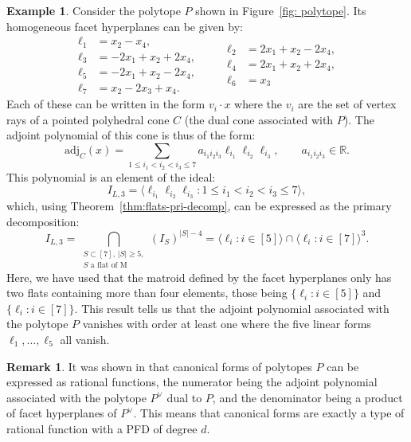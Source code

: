 \documentclass [a4paper,reqno, 11pt]{amsart}
\theoremstyle{plain}
\theoremstyle{plain}
\theoremstyle{plain}
\theoremstyle{plain}
\theoremstyle{definition}
\theoremstyle{definition}
\newtheorem{example}[theorem]{Example}
\theoremstyle{definition}
\newtheorem{remark}[theorem]{Remark}
\theoremstyle{definition}
\theoremstyle{definition}
\theoremstyle{definition}
\begin{document}
\begin{example}\label{ex: polytope adjoint polynomial}
Consider the polytope $P$ shown in Figure~\ref{fig: polytope}. Its homogeneous facet hyperplanes can be given by:
\begin{equation*}
\begin{aligned}
   \ell_1&=x_2-x_4,\\
   \ell_3&=-2x_1+x_2+2x_4,\\
   \ell_5&=-2x_1+x_2-2x_4,\\
   \ell_7&=x_2-2x_3+x_4.
\end{aligned}
\quad\quad
\begin{aligned}
    \ell_2&=2x_1+x_2-2x_4,\\
    \ell_4&=2x_1+x_2+2x_4,\\
    \ell_6&=x_3
\end{aligned}
\end{equation*}
Each of these can be written in the form $v_i\cdot x$ where the $v_i$ are the set of vertex rays of a pointed polyhedral cone $C$ (the dual cone associated with $P$). The adjoint polynomial of this cone is thus of the form:
\begin{equation*}
    \text{adj}_C(x)=\sum_{1\leq i_1<i_2<i_3\leq 7}a_{i_1 i_2i_3}\ell_{i_1}\ell_{i_2}\ell_{i_3},\qquad a_{i_1i_2i_3}\in\mathbb{R}.
\end{equation*}
This polynomial is an element of the ideal:
\[I_{L,3}=\langle\ell_{i_1}\ell_{i_2}\ell_{i_3}:1\le i_1<i_2<i_3\le7\rangle,\]
which, using Theorem~\ref{thm:flats-pri-decomp}, can be expressed as the primary decomposition:
\begin{equation*}
    I_{L,3}=\bigcap_{\substack{S\subset[7],\,|S|\ge5,\\\text{$S$ a flat of M}}}(I_S)^{|S|-4}=\langle\ell_i:i\in[5]\rangle\cap\langle\ell_i:i\in[7]\rangle^3.
\end{equation*}
Here, we have used that the matroid defined by the facet hyperplanes only has two flats containing more than four elements, those being $\{\ell_i:i\in[5]\}$ and $\{\ell_i:i\in[7]\}$. This result tells us that the adjoint polynomial associated with the polytope $P$ vanishes with order at least one where the five linear forms $\ell_1,\ldots,\ell_5$ all vanish.
\end{example}

\begin{remark}
It was shown in \cite{Gae} that canonical forms of polytopes $P$ can be expressed as rational functions, the numerator being the adjoint polynomial associated with the polytope $P^\vee$ dual to $P$, and the denominator being a product of facet hyperplanes of $P^\vee$. This means that canonical forms are exactly a type of rational function with a PFD of degree $d$.
\end{remark}
\end{document}

